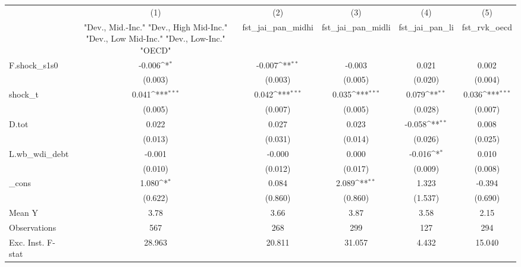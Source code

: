 {
\def\sym#1{\ifmmode^{#1}\else\(^{#1}\)\fi}
\begin{tabular}{l*{5}{c}}
\toprule
            &\multicolumn{1}{c}{(1)}&\multicolumn{1}{c}{(2)}&\multicolumn{1}{c}{(3)}&\multicolumn{1}{c}{(4)}&\multicolumn{1}{c}{(5)}\\
            &\multicolumn{1}{c}{ "Dev., Mid.-Inc." "Dev., High Mid-Inc." "Dev., Low Mid-Inc." "Dev., Low-Inc." "OECD" }&\multicolumn{1}{c}{fst\_jai\_pan\_midhi}&\multicolumn{1}{c}{fst\_jai\_pan\_midli}&\multicolumn{1}{c}{fst\_jai\_pan\_li}&\multicolumn{1}{c}{fst\_rvk\_oecd}\\
\midrule
F.shock\_s1s0&      -0.006\sym{*}  &      -0.007\sym{**} &      -0.003         &       0.021         &       0.002         \\
            &     (0.003)         &     (0.003)         &     (0.005)         &     (0.020)         &     (0.004)         \\
\addlinespace
shock\_t     &       0.041\sym{***}&       0.042\sym{***}&       0.035\sym{***}&       0.079\sym{**} &       0.036\sym{***}\\
            &     (0.005)         &     (0.007)         &     (0.005)         &     (0.028)         &     (0.007)         \\
\addlinespace
D.tot       &       0.022         &       0.027         &       0.023         &      -0.058\sym{**} &       0.008         \\
            &     (0.013)         &     (0.031)         &     (0.014)         &     (0.026)         &     (0.025)         \\
\addlinespace
L.wb\_wdi\_debt&      -0.001         &      -0.000         &       0.000         &      -0.016\sym{*}  &       0.010         \\
            &     (0.010)         &     (0.012)         &     (0.017)         &     (0.009)         &     (0.008)         \\
\addlinespace
\_cons      &       1.080\sym{*}  &       0.084         &       2.089\sym{**} &       1.323         &      -0.394         \\
            &     (0.622)         &     (0.860)         &     (0.860)         &     (1.537)         &     (0.690)         \\
\midrule
Mean Y      &        3.78         &        3.66         &        3.87         &        3.58         &        2.15         \\
Observations&         567         &         268         &         299         &         127         &         294         \\
Exc. Inst. F-stat&      28.963         &      20.811         &      31.057         &       4.432         &      15.040         \\
\bottomrule
\end{tabular}
}
